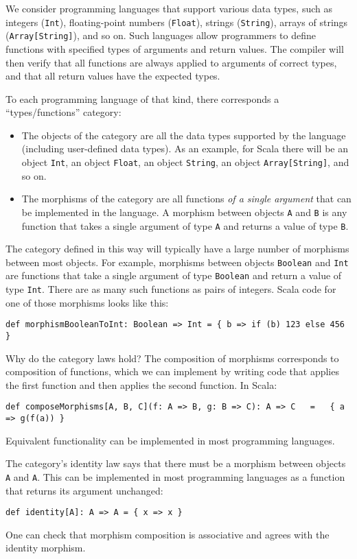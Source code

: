 We consider programming languages that support various data types,
such as integers (\lstinline!Int!), floating-point numbers (\lstinline!Float!),
strings (\lstinline!String!), arrays of strings (\lstinline!Array[String]!),
and so on. Such languages allow programmers to define functions with
specified types of arguments and return values. The compiler will
then verify that all functions are always applied to arguments of
correct types, and that all return values have the expected types. 

To each programming language of that kind, there corresponds a \textsf{``}types/functions\textsf{''}
category:
\begin{itemize}
\item The objects of the category are all the data types supported by the
language (including user-defined data types). As an example, for Scala
there will be an object \lstinline!Int!, an object \lstinline!Float!,
an object \lstinline!String!, an object \lstinline!Array[String]!,
and so on.
\item The morphisms of the category are all functions \emph{of a single
argument} that can be implemented in the language. A morphism between
objects \lstinline!A! and \lstinline!B! is any function that takes
a single argument of type \lstinline!A! and returns a value of type
\lstinline!B!.
\end{itemize}
The category defined in this way will typically have a large number
of morphisms between most objects. For example, morphisms between
objects \lstinline!Boolean! and \lstinline!Int! are functions that
take a single argument of type \lstinline!Boolean! and return a value
of type \lstinline!Int!. There are as many such functions as pairs
of integers. Scala code for one of those morphisms looks like this:
\begin{lstlisting}
def morphismBooleanToInt: Boolean => Int = { b => if (b) 123 else 456 }
\end{lstlisting}

Why do the category laws hold? The composition of morphisms corresponds
to composition of functions, which we can implement by writing code
that applies the first function and then applies the second function.
In Scala:
\begin{lstlisting}
def composeMorphisms[A, B, C](f: A => B, g: B => C): A => C   =   { a => g(f(a)) }
\end{lstlisting}
Equivalent functionality can be implemented in most programming languages.

The category\textsf{'}s identity law says that there must be a morphism between
objects \lstinline!A! and \lstinline!A!. This can be implemented
in most programming languages as a function that returns its argument
unchanged:
\begin{lstlisting}
def identity[A]: A => A = { x => x }
\end{lstlisting}
One can check that morphism composition is associative and agrees
with the identity morphism.

